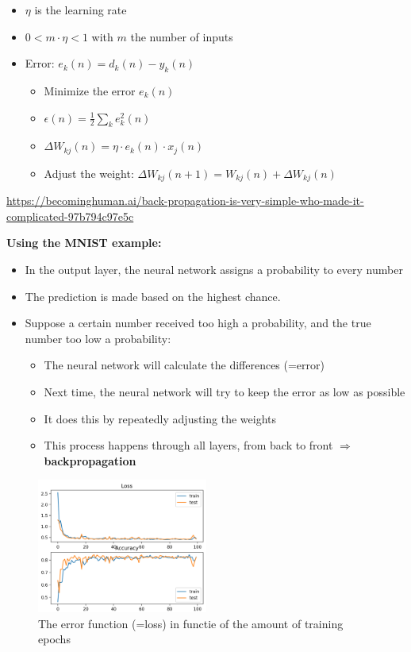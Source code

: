 \documentclass{article}
\begin{document}
\begin{itemize}
    \item $\eta$ is the learning rate
    \item $0 < m \cdot \eta < 1$ with $m$ the number of inputs
    \item Error: $e_k(n) = d_k(n) - y_k(n)$
    \begin{itemize}
        \item Minimize the error $e_k(n)$
        \item $\epsilon(n) = \frac12 \sum_k e^2_k(n)$
        \item $\Delta W_{kj}(n) = \eta \cdot e_k(n) \cdot x_j(n)$
        \item Adjust the weight: $\Delta W_{kj}(n+1) = W_{kj}(n) + \Delta W_{kj}(n)$
    \end{itemize}
\end{itemize}

\url{https://becominghuman.ai/back-propagation-is-very-simple-who-made-it-complicated-97b794c97e5c}

\textbf{Using the MNIST example:}

\begin{itemize}
    \item In the output layer, the neural network assigns a probability to every number
    \item The prediction is made based on the highest chance.
    \item Suppose a certain number received too high a probability, and the true number too low a probability:
    \begin{itemize}
        \item The neural network will calculate the differences (=error)
        \item Next time, the neural network will try to keep the error as low as possible
        \item It does this by repeatedly adjusting the weights
        \item This process happens through all layers, from back to front $\Rightarrow$ \textbf{backpropagation}
    \end{itemize}
\end{itemize}

\begin{figure}[H]
    \centering
    \includegraphics[width=0.5\textwidth]{backpropagation-error.png}
    \caption{The error function (=loss) in functie of the amount of training epochs}
\end{figure}
\end{document}
